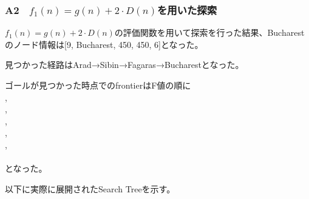 \documentclass[a4paper,11pt,dvipdfmx]{jsarticle}
\begin{document}
\subsubsection{A2　$f_1(n)=g(n)+2 \cdot D(n)$を用いた探索}
$f_1(n)=g(n)+2 \cdot D(n)$の評価関数を用いて探索を行った結果、Bucharestのノード情報は[9, Bucharest, 450, 450, 6]となった。

見つかった経路はArad→Sibin→Fagaras→Bucharestとなった。

ゴールが見つかった時点でのfrontierはF値の順に \\ , \\ \noindent
[3, Timisoara, 118, 776, 1], \\ \noindent
[4, Zerind, 75, 823, 1], \\ \noindent
[10, Sibiu, 338, 844, 6], \\ \noindent
[5, Arad, 280, 1012, 2], \\ \noindent
[7, Oradea, 291, 1051, 2] \\ \noindent
となった。

以下に実際に展開されたSearch Treeを示す。
\\
\end{document}
